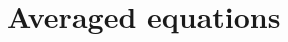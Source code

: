 \documentclass{sintefbeamer}
\begin{document}
  
  




\section{Averaged equations}
\section*{}
\end{document}

